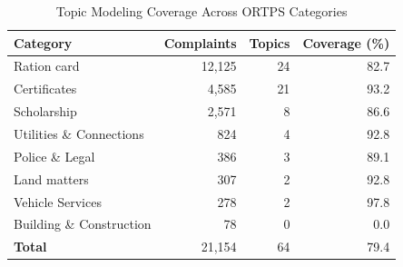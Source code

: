 \begin{table}[htbp]
\centering
\caption{Topic Modeling Coverage Across ORTPS Categories}
\label{tab:topic_summary}
\begin{tabular}{lrrr}
\toprule
Category & Complaints & Topics & Coverage (\%) \\
\midrule
Ration card & 12,125 & 24 & 82.7 \\
Certificates & 4,585 & 21 & 93.2 \\
Scholarship & 2,571 & 8 & 86.6 \\
Utilities \& Connections & 824 & 4 & 92.8 \\
Police \& Legal & 386 & 3 & 89.1 \\
Land matters & 307 & 2 & 92.8 \\
Vehicle Services & 278 & 2 & 97.8 \\
Building \& Construction & 78 & 0 & 0.0 \\
\midrule
\textbf{Total} & 21,154 & 64 & 79.4 \\
\bottomrule
\end{tabular}
\end{table}